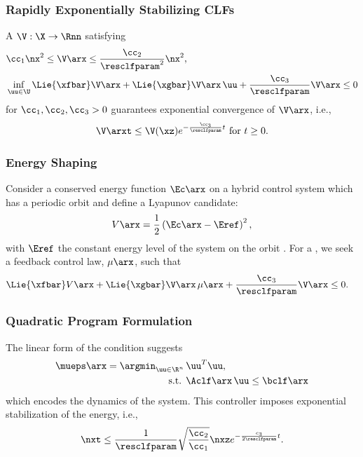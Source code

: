 \begin{frame}[t]
  \frametitle{Rapidly Exponentially Stabilizing CLFs}
  A 
  $\V : \X \to \Rnn$ satisfying
  \begin{align*}
    &\cc_{1} \nx^{2} \leq \V\arx \leq \frac{\cc_{2}}{\resclfparam^{2}} \nx^{2},\\
    &\inf_{\uu \in \U} \Lie{\xfbar}\V\arx + \Lie{\xgbar}\V\arx \, \uu +
    \frac{\cc_{3}}{\resclfparam} \V\arx \leq 0
  \end{align*}
  for $\cc_{1}, \cc_{2}, \cc_{3} > 0$ guarantees exponential convergence of $\V\arx$, i.e.,
  \begin{align*}
    \V\arxt \leq \V(\xz) e^{-\frac{\cc_{3}}{\resclfparam} t} \mbox{ for } t \geq 0.
  \end{align*}
\end{frame}

\begin{frame}[t]
  \frametitle{Energy Shaping}
  Consider a conserved energy function $\Ec\arx$ on a hybrid control system
  \HCSbar which has a periodic orbit \orbit and define a Lyapunov candidate:
  \begin{align*}
    V\arx = \frac{1}{2} \left(\Ec\arx - \Eref\right)^{2},
  \end{align*}
  with $\Eref$ the constant energy level of the system on the orbit
  \orbit. For a \RESCLF, we seek a feedback control law, $\mu\arx$, such that
  \begin{align*}
    \Lie{\xfbar} V\arx + \Lie{\xgbar} \V\arx \, \mu\arx + \frac{\cc_{3}}{\resclfparam} \V\arx &\leq 0.
  \end{align*}
\end{frame}

\begin{frame}[t]
  \frametitle{Quadratic Program Formulation}
  The linear form of the \RESCLF condition suggests
  \begin{align*}
    \mueps\arx = \argmin_{\uu \in \R^{n}}  \, & \uu^T \uu,\\
    \mbox{s.t. } & \Aclf\arx \, \uu \leq \bclf\arx
  \end{align*}
  which encodes the dynamics of the system. This controller imposes exponential
  stabilization of the energy, i.e.,
  \begin{align*}
    \nxt \leq \frac{1}{\resclfparam}
    \sqrt{\frac{\cc_{2}}{\cc_{1}}} \nxz e^{-\frac{c_{3}}{2\resclfparam} t}.
  \end{align*}
\end{frame}


